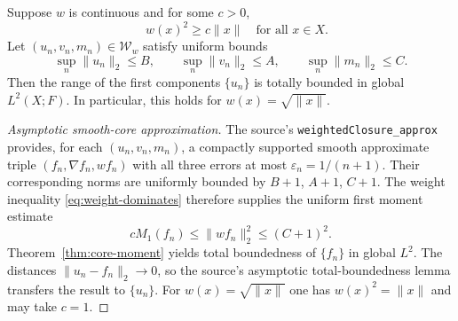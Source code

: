 \begin{theorem}\label{thm:weighted-closure}
Suppose \(w\) is continuous and for some \(c>0\),
\begin{equation}\label{eq:weight-dominates}
 \quad w(x)^2\ge c\|x\|\quad\text{for all }x\in X.
\end{equation}
Let \((u_n,v_n,m_n)\in\mathcal W_w\) satisfy uniform bounds
\begin{equation}\label{eq:weighted-triple-bounds}
 \sup_n\|u_n\|_2\le B,\qquad
 \sup_n\|v_n\|_2\le A,\qquad
 \sup_n\|m_n\|_2\le C.
\end{equation}
Then the range of the first components \(\{u_n\}\) is totally
bounded in global \(L^2(X;F)\). In particular, this holds for
\(w(x)=\sqrt{\|x\|}\).
\end{theorem}
\begin{proof}[Asymptotic smooth-core approximation]
The source's \texttt{weightedClosure\_approx} provides, for each
\((u_n,v_n,m_n)\), a compactly supported smooth approximate triple
\((f_n,\nabla f_n,wf_n)\) with all three errors at most
\(\varepsilon_n=1/(n+1)\). Their corresponding norms are uniformly
bounded by \(B+1\), \(A+1\), \(C+1\). The weight inequality
\eqref{eq:weight-dominates} therefore supplies the uniform first
moment estimate
\begin{equation}\label{eq:weighted-moment}
 c M_1(f_n)\le\|wf_n\|_2^2\le(C+1)^2.
\end{equation}
Theorem~\ref{thm:core-moment} yields total boundedness of
\(\{f_n\}\) in global \(L^2\). The distances
\(\|u_n-f_n\|_2\to0\), so the source's asymptotic total-boundedness
lemma transfers the result to \(\{u_n\}\). For
\(w(x)=\sqrt{\|x\|}\) one has \(w(x)^2=\|x\|\) and may take \(c=1\).
\end{proof}

